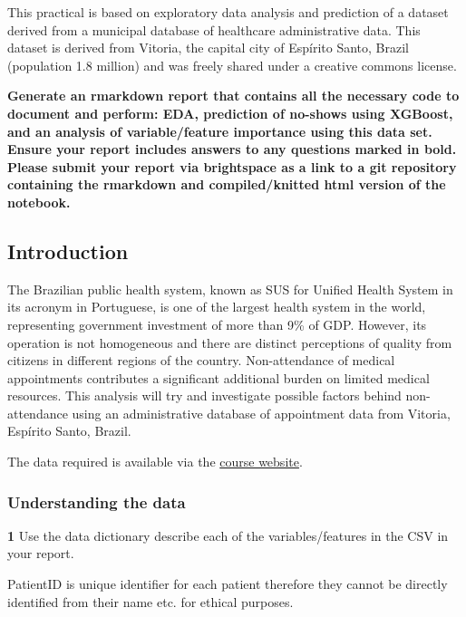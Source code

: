 \documentclass[
]{article}
\author{}
\date{\vspace{-2.5em}}
\begin{document}
This practical is based on exploratory data analysis and prediction of a
dataset derived from a municipal database of healthcare administrative
data. This dataset is derived from Vitoria, the capital city of Espírito
Santo, Brazil (population 1.8 million) and was freely shared under a
creative commons license.

\textbf{Generate an rmarkdown report that contains all the necessary
code to document and perform: EDA, prediction of no-shows using XGBoost,
and an analysis of variable/feature importance using this data set.
Ensure your report includes answers to any questions marked in bold.
Please submit your report via brightspace as a link to a git repository
containing the rmarkdown and compiled/knitted html version of the
notebook.}

\hypertarget{introduction}{%
\subsection{Introduction}\label{introduction}}

The Brazilian public health system, known as SUS for Unified Health
System in its acronym in Portuguese, is one of the largest health system
in the world, representing government investment of more than 9\% of
GDP. However, its operation is not homogeneous and there are distinct
perceptions of quality from citizens in different regions of the
country. Non-attendance of medical appointments contributes a
significant additional burden on limited medical resources. This
analysis will try and investigate possible factors behind non-attendance
using an administrative database of appointment data from Vitoria,
Espírito Santo, Brazil.

The data required is available via the
\href{https://github.com/maguire-lab/health_data_science_research/tree/master/static_files/practicals/lab1_data}{course
website}.

\hypertarget{understanding-the-data}{%
\subsubsection{Understanding the data}\label{understanding-the-data}}

\textbf{1} Use the data dictionary describe each of the
variables/features in the CSV in your report.

PatientID is unique identifier for each patient therefore they cannot be
directly identified from their name etc. for ethical purposes.
\end{document}
